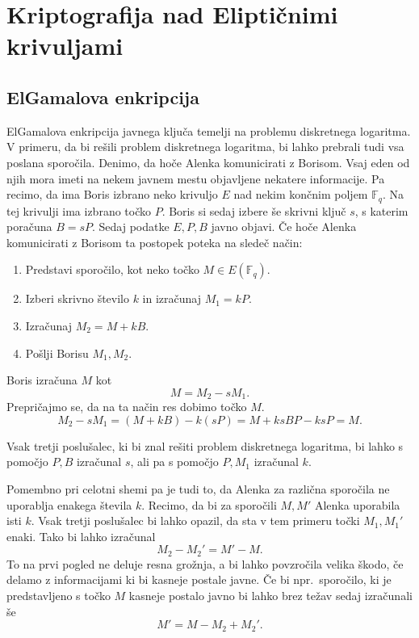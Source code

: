 \documentclass[12pt,a4paper,twoside]{article}
\theoremstyle{definition} %
\theoremstyle{plain} %
\numberwithin{equation}{section}  %
\newcommand{\F}{\mathbb F}
\newcommand{\E}[1]{E({#1})}
\begin{document}

\section{Kriptografija nad Eliptičnimi krivuljami}

\subsection{ElGamalova enkripcija}

ElGamalova enkripcija javnega ključa temelji na problemu diskretnega logaritma. V primeru, da bi rešili problem diskretnega logaritma, bi lahko prebrali tudi vsa poslana sporočila. Denimo, da hoče Alenka komunicirati z Borisom. Vsaj eden od njih mora imeti na nekem javnem mestu objavljene nekatere informacije. Pa recimo, da ima Boris izbrano neko krivuljo $E$ nad nekim končnim poljem $\F_q$. Na tej krivulji ima izbrano točko $P$. Boris si sedaj izbere še skrivni ključ $s$, s katerim poračuna $B=sP$. Sedaj podatke $E,P,B$ javno objavi. Če hoče Alenka komunicirati z Borisom ta postopek poteka na sledeč način:
\begin{enumerate}
\item Predstavi sporočilo, kot neko točko $M\in \E{\F_q}$.
\item Izberi skrivno število $k$ in izračunaj $M_1 = kP$.
\item Izračunaj $M_2 = M+kB$.
\item Pošlji Borisu $M_1,M_2$.
\end{enumerate}

Boris izračuna $M$ kot
$$M = M_2-sM_1.$$
Prepričajmo se, da na ta način res dobimo točko $M$.
$$M_2-sM_1 = (M+kB)-k(sP)=M+ksBP-ksP = M.$$

Vsak tretji poslušalec, ki bi znal rešiti problem diskretnega logaritma, bi lahko s pomočjo $P,B$ izračunal $s$, ali pa s pomočjo $P,M_1$ izračunal $k$.

Pomembno pri celotni shemi pa je tudi to, da Alenka za različna sporočila ne uporablja enakega števila $k$. Recimo, da bi za sporočili $M,M'$ Alenka uporabila isti $k$. Vsak tretji poslušalec bi lahko opazil, da sta v tem primeru točki $M_1,M_1'$ enaki. Tako bi lahko izračunal
$$M_2-M_2' = M'-M.$$
To na prvi pogled ne deluje resna grožnja, a bi lahko povzročila velika škodo, če delamo z informacijami ki bi kasneje postale javne. Če bi npr.\ sporočilo, ki je predstavljeno s točko $M$ kasneje postalo javno bi lahko brez težav sedaj izračunali še
$$M' = M-M_2+M_2'.$$
\end{document}

